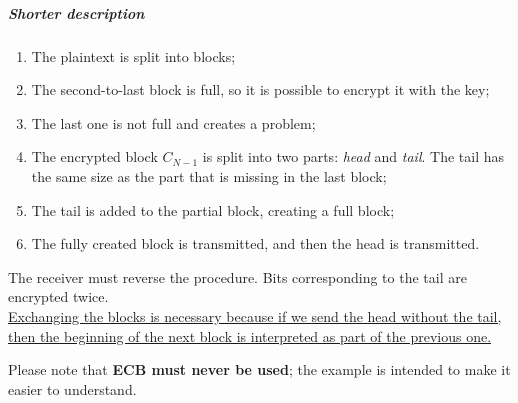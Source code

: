 \subparagraph{Shorter description}
\begin{enumerate}
	\item The plaintext is split into blocks;
	\item The second-to-last block is full, so it is possible to encrypt it with the key;
	\item The last one is not full and creates a problem;
	\item The encrypted block $C_{N-1}$ is split into two parts: \textit{head} and \textit{tail}. The tail has the same size as the part that is missing in the last block;
	\item The tail is added to the partial block, creating a full block;
	\item The fully created block is transmitted, and then the head is transmitted.
\end{enumerate}
The receiver must reverse the procedure. Bits corresponding to the tail are encrypted twice.\\ \ul{Exchanging the blocks is necessary because if we send the head without the tail, then the beginning of the next block is interpreted as part of the previous one.}

Please note that \textbf{ECB must never be used}; the example is intended to make it easier to understand.

